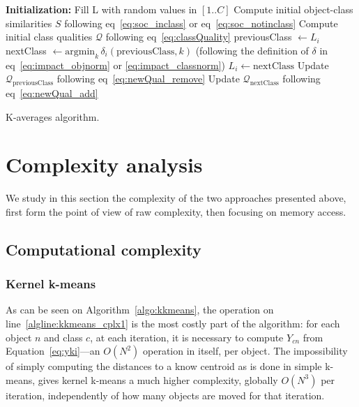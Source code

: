 \documentclass[a4paper,twoside]{article}
\newcommand{\cad}{---} %
\begin{document}
\begin{algorithm}
	\label{algo:kaverages}
	\SetAlgoLined
	\BlankLine	
	\textbf{Initialization:}
		Fill L with random values in $[1..C]$\;
		Compute initial object-class similarities $S$ following eq~\ref{eq:soc_inclass} or eq~\ref{eq:soc_notinclass}\;
		Compute initial class qualities $\mathcal{Q}$ following eq~\ref{eq:classQuality}\;
	\BlankLine	
	 {
		 {
			previousClass $\leftarrow L_i$\;
			nextClass $\leftarrow \mathrm{argmin}_k\,\delta_i(\mathrm{previousClass}, k)$ \label{algline:kaverages_search}
			(following the definition of $\delta$ in eq~\ref{eq:impact_objnorm} or \ref{eq:impact_classnorm})\;
			 {
				$L_i \leftarrow \mathrm{nextClass}$\;
				Update $\mathcal{Q}_\mathrm{previousClass}$ following eq~\ref{eq:newQual_remove}\;
				Update $\mathcal{Q}_\mathrm{nextClass}$ following eq~\ref{eq:newQual_add}\;
			}
		}
	}
	\BlankLine
	\caption{K-averages algorithm.}
\end{algorithm}


\section{Complexity analysis}
\label{sec:complexity}

We study in this section the complexity of the two approaches presented above, first form the point of view of raw complexity, then focusing on memory access.

\subsection{Computational complexity}

\subsubsection{Kernel k-means}

As can be seen on Algorithm~\ref{algo:kkmeans}, the operation on line~\ref{algline:kkmeans_cplx1} is the most costly part of the algorithm: for each object $n$ and class $c$, at each iteration, it is necessary to compute $Y_{cn}$ from Equation~\ref{eq:yki}\cad{}an $O(N^2)$ operation in itself, per object. The impossibility of simply computing the distances to a know centroid as is done in simple k-means, gives kernel k-means a much higher complexity, globally $O(N^3)$ per iteration, independently of how many objects are moved for that iteration.
\end{document}
